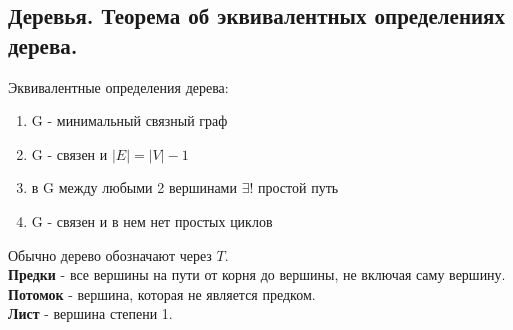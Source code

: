 \subsection{Деревья. Теорема об эквивалентных определениях дерева.}

Эквивалентные определения дерева:

\begin{enumerate}
    \item G - минимальный связный граф
    \item G - связен и $|E| = |V| - 1$
    \item в G между любыми 2 вершинами $\exists!$ простой путь
    \item G - связен и в нем нет простых циклов
\end{enumerate}

Обычно дерево обозначают через $T$.\\

\textbf{Предки} - все вершины на пути от корня до вершины, не включая саму вершину.\\

\textbf{Потомок} - вершина, которая не является предком.\\

\textbf{Лист} - вершина степени 1.